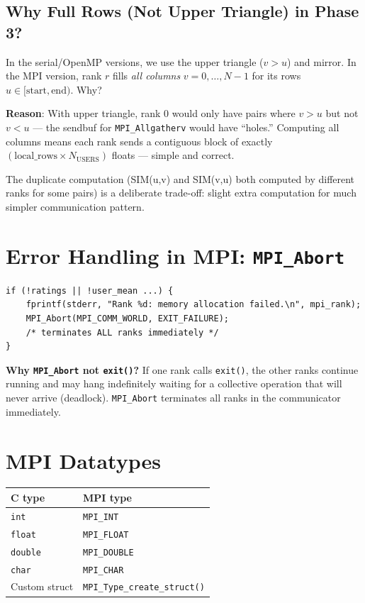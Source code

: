 \documentclass[12pt,a4paper]{article}
\begin{document}
\subsection{Why Full Rows (Not Upper Triangle) in Phase 3?}

In the serial/OpenMP versions, we use the upper triangle ($v > u$) and mirror.
In the MPI version, rank $r$ fills \emph{all columns} $v = 0, \ldots, N-1$
for its rows $u \in [\text{start}, \text{end})$.  Why?

\textbf{Reason}: With upper triangle, rank 0 would only have pairs where $v > u$
but not $v < u$ — the sendbuf for \texttt{MPI\_Allgatherv} would have ``holes.''
Computing all columns means each rank sends a contiguous block of exactly
$(\text{local\_rows} \times N_{\text{USERS}})$ floats — simple and correct.

The duplicate computation (SIM(u,v) and SIM(v,u) both computed by different ranks
for some pairs) is a deliberate trade-off: slight extra computation for much
simpler communication pattern.

\section{Error Handling in MPI: \texttt{MPI\_Abort}}

\begin{lstlisting}
if (!ratings || !user_mean ...) {
    fprintf(stderr, "Rank %d: memory allocation failed.\n", mpi_rank);
    MPI_Abort(MPI_COMM_WORLD, EXIT_FAILURE);
    /* terminates ALL ranks immediately */
}
\end{lstlisting}

\textbf{Why \texttt{MPI\_Abort} not \texttt{exit()}?}  If one rank calls
\texttt{exit()}, the other ranks continue running and may hang indefinitely
waiting for a collective operation that will never arrive (deadlock).
\texttt{MPI\_Abort} terminates all ranks in the communicator immediately.

\section{MPI Datatypes}

\begin{center}
\begin{tabular}{ll}
\toprule
C type & MPI type \\
\midrule
\texttt{int} & \texttt{MPI\_INT} \\
\texttt{float} & \texttt{MPI\_FLOAT} \\
\texttt{double} & \texttt{MPI\_DOUBLE} \\
\texttt{char} & \texttt{MPI\_CHAR} \\
Custom struct & \texttt{MPI\_Type\_create\_struct()} \\
\bottomrule
\end{tabular}
\end{center}
\end{document}
